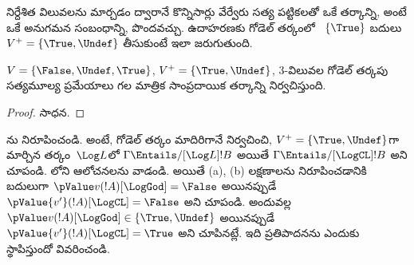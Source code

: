 \documentclass[../../../include/open-logic-section]{subfiles}
\begin{document}
నిర్దేశిత విలువలను మార్చడం ద్వారానే కొన్నిసార్లు
వేర్వేరు సత్య పట్టికలతో ఒకే తర్కాన్ని, అంటే ఒకే
అనుగమన సంబంధాన్ని, పొందవచ్చు. ఉదాహరణకు గోడెల్ తర్కంలో
~$\{\True\}$ బదులు $V^+ = \{\True,
\Undef\}$ తీసుకుంటే ఇలా జరుగుతుంది.

\begin{prop}
  $V = \{\False, \Undef,\True\}$,
  $V^+=\{\True,
  \Undef\}$, $3$-విలువల గోడెల్ తర్కపు
  సత్యమూల్య ప్రమేయాలు గల మాత్రిక
  సాంప్రదాయిక తర్కాన్ని నిర్వచిస్తుంది.
\end{prop}

\begin{proof}
  సాధన.
\end{proof}

\begin{prob}
  ను
నిరూపించండి. అంటే, గోడెల్ తర్కం మాదిరిగానే
నిర్వచించి, $V^+=\{\True,\Undef\}$గా
మార్చిన తర్కం~$\Log L$లో
$\Gamma \Entails/[\Log L] !B$ అయితే
$\Gamma \Entails/[\LogCL] !B$ అని చూపండి.
లోని ఆలోచనలను వాడండి. అయితే (a), (b)
లక్షణాలను నిరూపించడానికి బదులుగా
$\pValue v(!A)[\LogGod] = \False$
అయినప్పుడే $\pValue {v'}(!A)[\LogCL] = \False$
అని చూపండి. అందువల్ల
$\pValue
  v(!A)[\LogGod] \in \{\True,\Undef\}$
అయినప్పుడే
$\pValue {v'}(!A)[\LogCL] =
  \True$ అని చూపినట్లే. ఇది ప్రతిపాదనను
ఎందుకు స్థాపిస్తుందో వివరించండి.
\end{prob}
\end{document}
